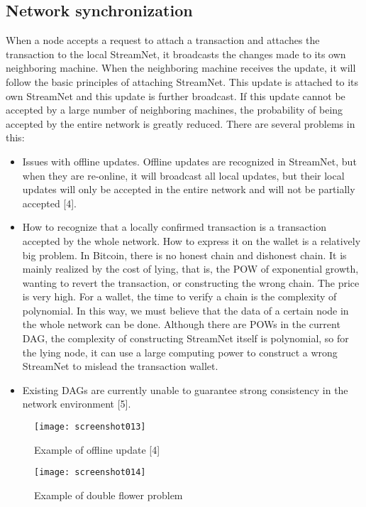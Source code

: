 \documentclass{article}
\begin{document}
\subsection{Network synchronization}
When a node accepts a request to attach a transaction and attaches the transaction to the local StreamNet, it broadcasts the changes made to its own neighboring machine. When the neighboring machine receives the update, it will follow the basic principles of attaching StreamNet. This update is attached to its own StreamNet and this update is further broadcast. If this update cannot be accepted by a large number of neighboring machines, the probability of being accepted by the entire network is greatly reduced. There are several problems in this:
\begin{itemize}
	\item Issues with offline updates. Offline updates are recognized in StreamNet, but when they are re-online, it will broadcast all local updates, but their local updates will only be accepted in the entire network and will not be partially accepted [4].
	\item How to recognize that a locally confirmed transaction is a transaction accepted by the whole network. How to express it on the wallet is a relatively big problem. In Bitcoin, there is no honest chain and dishonest chain. It is mainly realized by the cost of lying, that is, the POW of exponential growth, wanting to revert the transaction, or constructing the wrong chain. The price is very high. For a wallet, the time to verify a chain is the complexity of polynomial. In this way, we must believe that the data of a certain node in the whole network can be done. Although there are POWs in the current DAG, the complexity of constructing StreamNet itself is polynomial, so for the lying node, it can use a large computing power to construct a wrong StreamNet to mislead the transaction wallet.
	\item Existing DAGs are currently unable to guarantee strong consistency in the network environment [5].
\end{itemize}

\begin{figure}[H]
	\centering
	\texttt{[image: screenshot013]}
	\caption{Example of offline update [4]}
	\label{simulationfigure}
\end{figure}

\begin{figure}[H]
	\centering
	\texttt{[image: screenshot014]}
	\caption{Example of double flower problem}
	\label{simulationfigure}
\end{figure}
\end{document}
